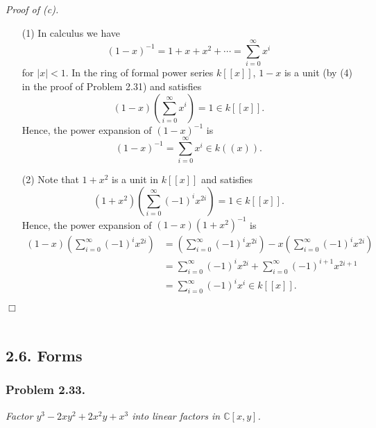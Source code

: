 \documentclass{article}
\begin{document}
\emph{Proof of (c).}
\begin{enumerate}
\item[(1)]
  In calculus we have
  \[
    (1-x)^{-1} = 1 + x + x^2 + \cdots = \sum_{i=0}^{\infty} x^i
  \]
  for $|x| < 1$.
  In the ring of formal power series $k[[x]]$, $1-x$ is a unit
  (by (4) in the proof of Problem 2.31) and satisfies
  \[
    (1-x)\left( \sum_{i=0}^{\infty} x^i \right) = 1 \in k[[x]].
  \]
  Hence, the power expansion of $(1-x)^{-1}$ is
  \[
    (1-x)^{-1} = \sum_{i=0}^{\infty} x^i \in k((x)).
  \]

\item[(2)]
  Note that $1+x^2$ is a unit in $k[[x]]$ and satisfies
  \[
    (1+x^2)\left( \sum_{i=0}^{\infty} (-1)^i x^{2i} \right)
    = 1 \in k[[x]].
  \]
  Hence, the power expansion of $(1-x)(1+x^2)^{-1}$ is
  \begin{align*}
    (1 - x)\left( \sum_{i=0}^{\infty} (-1)^i x^{2i} \right)
    &= \left( \sum_{i=0}^{\infty} (-1)^i x^{2i} \right)
      - x\left( \sum_{i=0}^{\infty} (-1)^i x^{2i} \right) \\
    &= \sum_{i=0}^{\infty} (-1)^i x^{2i} + \sum_{i=0}^{\infty} (-1)^{i+1} x^{2i+1} \\
    &= \sum_{i=0}^{\infty} (-1)^i x^{i} \in k[[x]].
  \end{align*}
\end{enumerate}
$\Box$ \\\\






\subsection*{2.6. Forms \\}



\subsubsection*{Problem 2.33.}
\emph{Factor $y^3 - 2xy^2 + 2x^2y + x^3$
into linear factors in $\mathbb{C}[x,y]$.} \\
\end{document}
